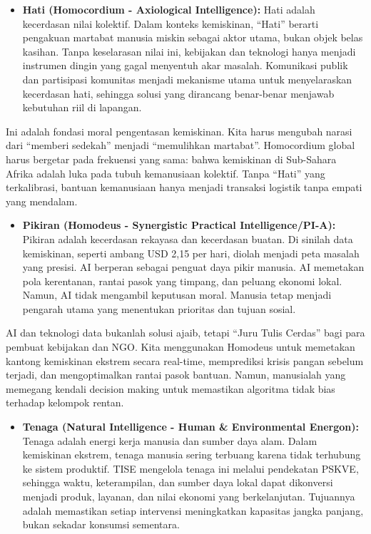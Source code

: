 \documentclass[
  letterpaper,
  DIV=11,
  numbers=noendperiod]{scrreprt}
\providecommand{\tightlist}{%
  \setlength{\itemsep}{0pt}\setlength{\parskip}{0pt}}
\begin{document}
\begin{itemize}
\tightlist
\item
  \textbf{Hati (Homocordium - Axiological Intelligence):} Hati adalah
  kecerdasan nilai kolektif. Dalam konteks kemiskinan, ``Hati'' berarti
  pengakuan martabat manusia miskin sebagai aktor utama, bukan objek
  belas kasihan. Tanpa keselarasan nilai ini, kebijakan dan teknologi
  hanya menjadi instrumen dingin yang gagal menyentuh akar masalah.
  Komunikasi publik dan partisipasi komunitas menjadi mekanisme utama
  untuk menyelaraskan kecerdasan hati, sehingga solusi yang dirancang
  benar-benar menjawab kebutuhan riil di lapangan.
\end{itemize}

Ini adalah fondasi moral pengentasan kemiskinan. Kita harus mengubah
narasi dari ``memberi sedekah'' menjadi ``memulihkan martabat''.
Homocordium global harus bergetar pada frekuensi yang sama: bahwa
kemiskinan di Sub-Sahara Afrika adalah luka pada tubuh kemanusiaan
kolektif. Tanpa ``Hati'' yang terkalibrasi, bantuan kemanusiaan hanya
menjadi transaksi logistik tanpa empati yang mendalam.

\begin{itemize}
\tightlist
\item
  \textbf{Pikiran (Homodeus - Synergistic Practical Intelligence/PI-A):}
  Pikiran adalah kecerdasan rekayasa dan kecerdasan buatan. Di sinilah
  data kemiskinan, seperti ambang USD 2,15 per hari, diolah menjadi peta
  masalah yang presisi. AI berperan sebagai penguat daya pikir manusia.
  AI memetakan pola kerentanan, rantai pasok yang timpang, dan peluang
  ekonomi lokal. Namun, AI tidak mengambil keputusan moral. Manusia
  tetap menjadi pengarah utama yang menentukan prioritas dan tujuan
  sosial.
\end{itemize}

AI dan teknologi data bukanlah solusi ajaib, tetapi ``Juru Tulis
Cerdas'' bagi para pembuat kebijakan dan NGO. Kita menggunakan Homodeus
untuk memetakan kantong kemiskinan ekstrem secara real-time, memprediksi
krisis pangan sebelum terjadi, dan mengoptimalkan rantai pasok bantuan.
Namun, manusialah yang memegang kendali decision making untuk memastikan
algoritma tidak bias terhadap kelompok rentan.

\begin{itemize}
\tightlist
\item
  \textbf{Tenaga (Natural Intelligence - Human \& Environmental
  Energon):} Tenaga adalah energi kerja manusia dan sumber daya alam.
  Dalam kemiskinan ekstrem, tenaga manusia sering terbuang karena tidak
  terhubung ke sistem produktif. TISE mengelola tenaga ini melalui
  pendekatan PSKVE, sehingga waktu, keterampilan, dan sumber daya lokal
  dapat dikonversi menjadi produk, layanan, dan nilai ekonomi yang
  berkelanjutan. Tujuannya adalah memastikan setiap intervensi
  meningkatkan kapasitas jangka panjang, bukan sekadar konsumsi
  sementara.
\end{itemize}
\end{document}
